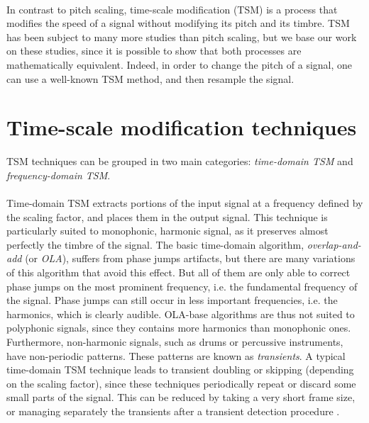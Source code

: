 \documentclass[letterpaper]{article}
\theoremstyle{definition}
\theoremstyle{remark}
\theoremstyle{plain}
\begin{document}
\paragraph{}
In contrast to pitch scaling, time-scale modification (TSM) is a process that
modifies the speed of a signal without modifying its pitch and its timbre.
TSM has been subject to many more studies than pitch scaling, but we base our
work on these studies, since it is possible to show that both processes are
mathematically equivalent. Indeed, in order to change the pitch of a signal, one
can use a well-known TSM method, and then resample the signal.

\section{Time-scale modification techniques}
TSM techniques can be grouped in two main categories: \emph{time-domain TSM} and
\emph{frequency-domain TSM}.

\paragraph{}
Time-domain TSM extracts portions of the input signal at a frequency defined by
the scaling factor, and places them in the output signal. This technique is
particularly suited to monophonic, harmonic signal, as it preserves almost
perfectly the timbre of the signal. The basic time-domain algorithm,
\emph{overlap-and-add} (or \emph{OLA}), suffers from phase jumps artifacts, but
there are many variations of this algorithm that avoid this effect. But all of
them are only able to correct phase jumps on the most prominent frequency, i.e.
the fundamental frequency of the signal. Phase jumps can still occur in less
important frequencies, i.e. the harmonics, which is clearly audible. OLA-base
algorithms are thus not suited to polyphonic signals, since they contains more
harmonics than monophonic ones. Furthermore, non-harmonic signals, such as drums
or percussive instruments, have non-periodic patterns. These patterns are known
as \emph{transients}. A typical time-domain TSM technique leads to transient
doubling or skipping (depending on the scaling factor), since these techniques
periodically repeat or discard some small parts of the signal. This can be
reduced by taking a very short frame size, or managing separately the transients
after a transient detection procedure \citep{Grofit2008}.
\end{document}

